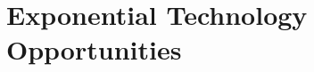 \documentclass[letter,11pt]{article}
\begin{document}

\section{Exponential Technology Opportunities}
\label{opportunities}
\end{document}
